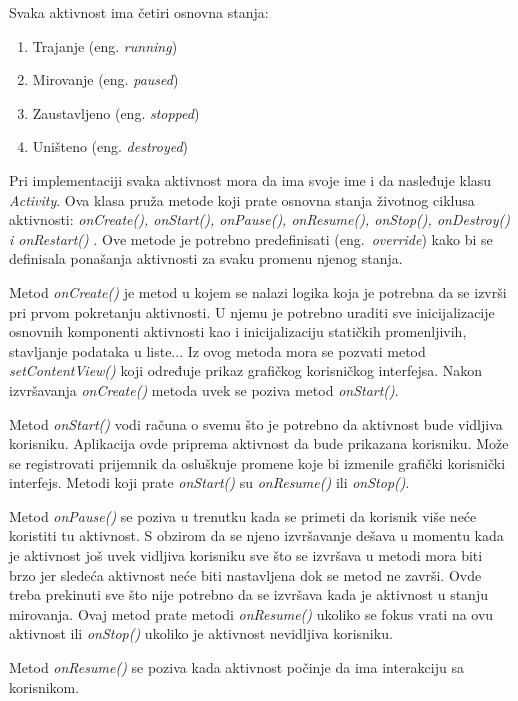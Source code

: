 \documentclass[android.tex]{subfiles}
\begin{document}
Svaka aktivnost ima četiri osnovna stanja: 
\begin{enumerate}
    \item Trajanje (eng. \textit{running})
    \item Mirovanje (eng. \textit{paused})
    \item Zaustavljeno (eng. \textit{stopped})
    \item Uništeno (eng. \textit{destroyed})
\end{enumerate}
Pri implementaciji svaka aktivnost mora da ima svoje ime i da nasleđuje klasu \textit{Activity}. Ova klasa pruža metode koji prate osnovna stanja životnog ciklusa aktivnosti: \textit{onCreate(), onStart(), onPause(), onResume(), onStop(), onDestroy() i onRestart()} \cite{book:and9cookbook}. Ove metode je potrebno predefinisati (eng.~\textit{override}) kako bi se definisala ponašanja aktivnosti za svaku promenu njenog stanja. 

Metod \textit{onCreate()} je metod u kojem se nalazi logika koja je potrebna da se izvrši pri prvom pokretanju aktivnosti. U njemu je potrebno uraditi sve inicijalizacije osnovnih komponenti aktivnosti kao i inicijalizaciju statičkih promenljivih, stavljanje podataka u liste... Iz ovog metoda mora se pozvati metod \textit{setContentView()} koji određuje prikaz grafičkog korisničkog interfejsa. Nakon izvršavanja \textit{onCreate() }metoda uvek se poziva metod \textit{onStart()}.

Metod \textit{onStart() }vodi računa o svemu što je potrebno da aktivnost bude vidljiva korisniku. Aplikacija ovde priprema aktivnost da bude prikazana korisniku. Može se registrovati prijemnik da osluškuje promene koje bi izmenile grafički korisnički interfejs. Metodi koji prate \textit{onStart()} su \textit{onResume() }ili \textit{onStop()}.

Metod \textit{onPause()} se poziva u trenutku kada se primeti da korisnik više neće koristiti tu aktivnost. S obzirom da se njeno izvršavanje dešava u momentu kada je aktivnost još uvek vidljiva korisniku sve što se izvršava u metodi mora biti brzo jer sledeća aktivnost neće biti nastavljena dok se metod ne završi. Ovde treba prekinuti sve što nije potrebno da se izvršava kada je aktivnost u stanju mirovanja. Ovaj metod prate metodi \textit{onResume()} ukoliko se fokus vrati na ovu aktivnost ili \textit{onStop() }ukoliko je aktivnost nevidljiva korisniku.

Metod \textit{onResume()} se poziva kada aktivnost počinje da ima interakciju sa korisnikom.
\end{document}
